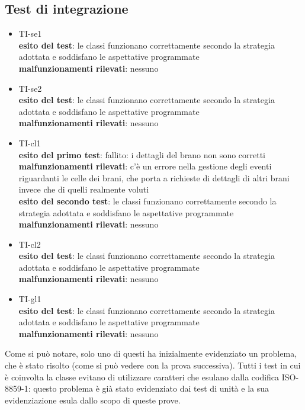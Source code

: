 \subsection{Test di integrazione}

\begin{itemize}
  \item TI-se1\\
  \textbf{esito del test}: le classi funzionano correttamente secondo la
  strategia adottata e soddisfano le aspettative programmate\\
  \textbf{malfunzionamenti rilevati}: nessuno\\
  
  \item TI-se2\\
  \textbf{esito del test}: le classi funzionano correttamente secondo la
  strategia adottata e soddisfano le aspettative programmate\\
  \textbf{malfunzionamenti rilevati}: nessuno\\
  
  \item TI-cl1\\
  \textbf{esito del primo test}: fallito: i dettagli del brano non sono
  corretti\\ 
  \textbf{malfunzionamenti rilevati}: c'\`e un errore nella gestione degli
  eventi riguardanti le celle dei brani, che porta a richieste di dettagli di
  altri brani invece che di quelli realmente voluti\\
  \textbf{esito del secondo test}: le classi funzionano correttamente secondo la
  strategia adottata e soddisfano le aspettative programmate\\
  \textbf{malfunzionamenti rilevati}: nessuno\\
  
  \item TI-cl2\\
  \textbf{esito del test}: le classi funzionano correttamente secondo la
  strategia adottata e soddisfano le aspettative programmate\\
  \textbf{malfunzionamenti rilevati}: nessuno\\
  
  \item TI-gl1\\
  \textbf{esito del test}: le classi funzionano correttamente secondo la
  strategia adottata e soddisfano le aspettative programmate\\
  \textbf{malfunzionamenti rilevati}: nessuno\\
\end{itemize}
Come si pu\`o notare, solo uno di questi ha inizialmente evidenziato un
problema, che \`e stato risolto (come si pu\`o vedere con la prova successiva).
Tutti i test in cui \`e coinvolta la classe  evitano di
utilizzare caratteri che esulano dalla codifica ISO-8859-1: questo problema \`e
gi\`a stato evidenziato dai test di unit\`a e la sua evidenziazione esula dallo
scopo di queste prove.


